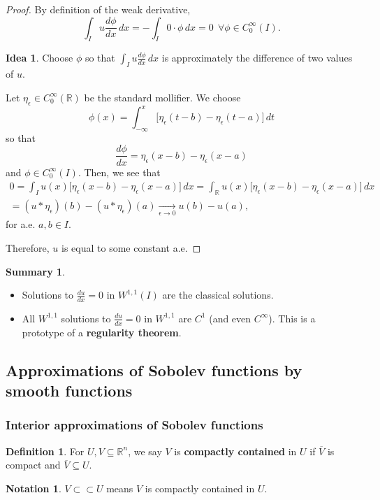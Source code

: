 \documentclass[12pt]{article}
\theoremstyle{definition}
\newtheorem*{definition*}{Definition}
\newtheorem*{notation}{Notation}
\newtheorem*{summary}{Summary}
\newtheorem*{idea}{Idea}
\begin{document}
\begin{proof}
By definition of the weak derivative,
\[\int_Iu\frac{d\phi}{dx}\,dx=-\int_I0\cdot\phi\,dx=0\ \ \forall\phi\in C_0^{\infty}(I).\]

\begin{idea}
Choose $\phi$ so that $\int_Iu\frac{d\phi}{dx}\,dx$ is approximately the difference of two values of $u$.
\end{idea}

Let $\eta_{\epsilon}\in C_0^{\infty}(\mathbb{R})$ be the standard mollifier. We choose
\[\phi(x)=\int_{-\infty}^x\big[\eta_{\epsilon}(t-b)-\eta_{\epsilon}(t-a)\big]\,dt\]
so that
\[\frac{d\phi}{dx}=\eta_{\epsilon}(x-b)-\eta_{\epsilon}(x-a)\]
and $\phi\in C_0^{\infty}(I)$. Then, we see that
\begin{multline*}
0=\int_Iu(x)\big[\eta_{\epsilon}(x-b)-\eta_{\epsilon}(x-a)\big]\,dx=\int_{\mathbb{R}}u(x)\big[\eta_{\epsilon}(x-b)-\eta_{\epsilon}(x-a)\big]\,dx\\
=(u*\eta_{\epsilon})(b)-(u*\eta_{\epsilon})(a)\xrightarrow[\epsilon\to0]{}u(b)-u(a),
\end{multline*}
for a.e. $a,b\in I$.

Therefore, $u$ is equal to some constant a.e.
\end{proof}

\begin{summary}
\begin{itemize}[label=$-$]
\item Solutions to $\frac{du}{dx}=0$ in $W^{1,1}(I)$ are the classical solutions.

\item All $W^{1,1}$ solutions to $\frac{du}{dx}=0$ in $W^{1,1}$ are $C^1$ (and even $C^{\infty}$). This is a prototype of a \textbf{regularity theorem}.
\end{itemize}
\end{summary}

\subsection{Approximations of Sobolev functions by smooth functions}
\subsubsection{Interior approximations of Sobolev functions}

\begin{definition*}
For $U,V\subseteq\mathbb{R}^n$, we say $V$ is \textbf{compactly contained} in $U$ if $\overline{V}$ is compact and $\overline{V}\subseteq U$.
\end{definition*}
\begin{notation}
$V\subset\subset U$ means $V$ is compactly contained in $U$.
\end{notation}
\end{document}
